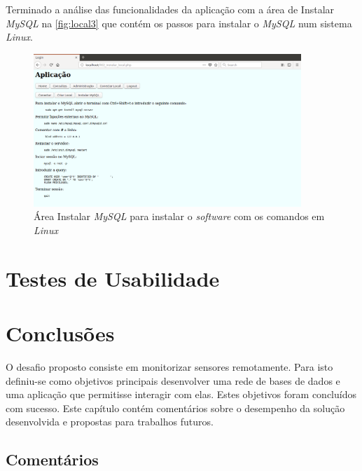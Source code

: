 \documentclass[11pt,twoside,a4paper]{report}
\begin{document}
\newpage
Terminado a análise das funcionalidades da aplicação com a área de Instalar \textit{MySQL} na \autoref{fig:local3} que contém os passos para instalar o \textit{MySQL} num sistema \textit{Linux}.
\begin{figure}[H]
	\centering
	\includegraphics[width=0.9\textwidth]{local04} %
	\caption{Área Instalar \textit{MySQL} para instalar o \textit{software} com os comandos em \textit{Linux}}
	\label{fig:local3}
\end{figure}

\cleardoublepage
\chapter{Testes de Usabilidade}
\label{chap:usabilidade}

\cleardoublepage
\chapter{Conclusões}
\label{chap:conclusoes}
O desafio proposto consiste em monitorizar sensores remotamente. Para isto definiu-se como objetivos principais desenvolver uma rede de bases de dados e uma aplicação que permitisse interagir com elas. Estes objetivos foram concluídos com sucesso. Este capítulo contém comentários sobre o desempenho da solução desenvolvida e propostas para trabalhos futuros.

\section{Comentários}
\end{document}
